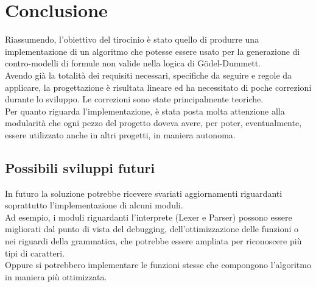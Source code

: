 \documentclass[\main/tesi.tex]{subfiles}
\begin{document}
\chapter{Conclusione}

Riassumendo, l'obiettivo del tirocinio è stato quello di produrre una implementazione di un algoritmo che potesse essere usato per la generazione di contro-modelli di formule non valide nella logica di G\"odel-Dummett. \\
Avendo già la totalità dei requisiti necessari, specifiche da seguire e regole da applicare, la progettazione è risultata lineare ed ha necessitato di poche correzioni durante lo sviluppo. Le correzioni sono state principalmente teoriche. \\
Per quanto riguarda l'implementazione, è stata posta molta attenzione alla modularità che ogni pezzo del progetto doveva avere, per poter, eventualmente, essere utilizzato anche in altri progetti, in maniera autonoma. \\

\section{Possibili sviluppi futuri}
In futuro la soluzione potrebbe ricevere svariati aggiornamenti riguardanti soprattutto l'implementazione di alcuni moduli.\\
Ad esempio, i moduli riguardanti l'interprete (Lexer e Parser) possono essere migliorati dal punto di vista del debugging, dell'ottimizzazione delle funzioni o nei riguardi della grammatica, che potrebbe essere ampliata per riconoscere più tipi di caratteri. \\
Oppure si potrebbero implementare le funzioni stesse che compongono l'algoritmo in maniera più ottimizzata. \\
\end{document}
